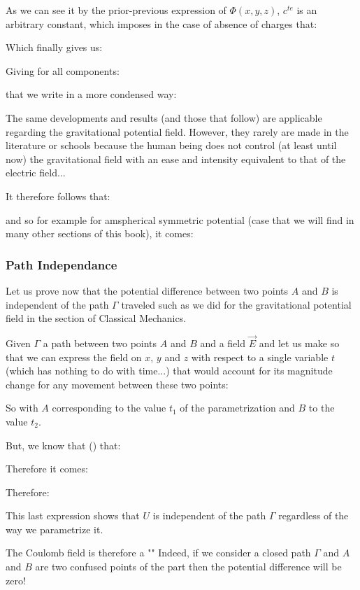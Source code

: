 	As we can see it by the prior-previous expression of $\Phi(x,y,z)$, $c^{te}$ is an arbitrary constant, which imposes in the case of absence of charges that:
	
	Which finally gives us:
	
	Giving for all components:
	
	that we write in a more condensed way:
	
	\begin{tcolorbox}[title=Remark,colframe=black,arc=10pt]
	The same developments and results (and those that follow) are applicable regarding the gravitational potential field. However, they rarely are made in the literature or schools because the human being does not control (at least until now) the gravitational field with an ease and intensity equivalent to that of the electric field...
	\end{tcolorbox}
	It therefore follows that:
	
	and so for example for amspherical symmetric potential (case that we will find in many other sections of this book), it comes:
	
	
	\pagebreak
	\subsubsection{Path Independance}
	Let us prove now that the potential difference between two points $A$ and $B$ is independent of the path $\Gamma$ traveled such as we did for the gravitational potential field in the section of Classical Mechanics.

	Given $\Gamma$ a path between two points $A$ and $B$ and a field $\vec{E}$ and let us make so that we can express the field on $x$, $y$ and $z$ with respect to a single variable $t$ (which has nothing to do with time...) that would account for its magnitude change for  any movement between these two points:
	
	So with $A$ corresponding to the value $t_1$ of the parametrization and $B$ to the value $t_2$. 
	
	But, we know that () that:
	
	Therefore it comes:
	
	Therefore:
	
	This last expression shows that $U$ is independent of the path $\Gamma$ regardless of the way we parametrize it.
	
	The Coulomb field is therefore a "" Indeed, if we consider a closed path $\Gamma$ and $A$ and $B$ are two confused points of the part then the potential difference will be zero!
	

